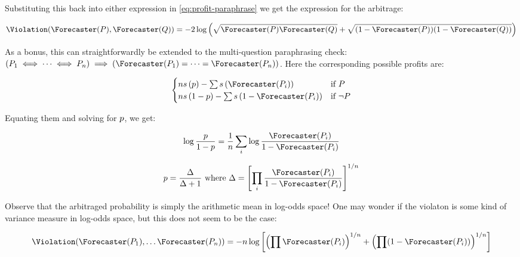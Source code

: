 Substituting this back into either expression in \eqref{eq:profit-paraphrase} we get the expression for the arbitrage:

\begin{equation}
\Violation(\priceP,\priceQ)=-2\log\left(\sqrt{\priceP\priceQ}+\sqrt{(1-\priceP)(1-\priceQ)}\right)
\label{eq:arbitrage-paraphrase}
\end{equation}

As a bonus, this can straightforwardly be extended to the multi-question paraphrasing check: $(P_1\iff\dots\iff P_n)\implies(\Forecaster(P_1)=\dots=\Forecaster(P_n))$. Here the corresponding possible profits are:

\begin{equation}
\begin{cases}
    n\score{\consp}-\sum{\score{\Forecaster(P_i)}} & \text{if } P \\
    n\score{1-\consp}-\sum{\score{1-\Forecaster(P_i)}} & \text{if } \lnot P
\end{cases}
\label{eq:profit-paraphrase-multi}
\end{equation}

Equating them and solving for $p$, we get:

\begin{equation}
    \log\frac{p}{1-p}=\frac1n\sum_i\log\frac{\Forecaster(P_i)}{1-\Forecaster(P_i)}
    \label{eq:logodds-paraphrase-multi}
\end{equation}

\begin{equation}
    p=\frac{\Delta}{\Delta+1}
    \text{ where }
    \Delta=\left[\prod_i\frac{\Forecaster(P_i)}{1-\Forecaster(P_i)}\right]^{1/n}
    \label{eq:prob-paraphrase-multi}
\end{equation}

Observe that the arbitraged probability is simply the arithmetic mean in log-odds space! One may wonder if the violaton is some kind of variance measure in log-odds space, but this does not seem to be the case:

\begin{equation}
    \Violation(\Forecaster(P_1),\dots\Forecaster(P_n))=-n\log\left[
    \left(\prod\Forecaster(P_i)\right)^{1/n} +
    \left(\prod(1-\Forecaster(P_i))\right)^{1/n}
    \right]
    \label{eq:violation-paraphrase-multi}
\end{equation}

\label{apps:arbitrage-neg}



